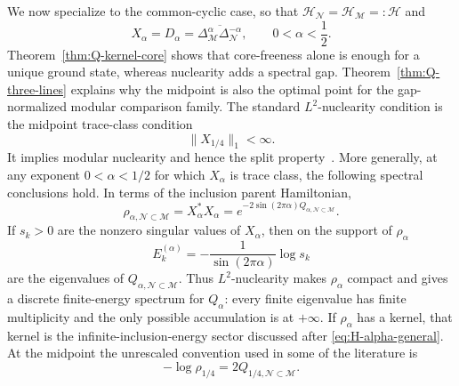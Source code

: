 \documentclass[a4paper,11pt]{article}
\theoremstyle{definition}
\newcommand{\mN}{\mathcal{N}}
\newcommand{\mH}{\mathcal{H}}
\newcommand{\mM}{\mathcal{M}}
\begin{document}
We now specialize to the common-cyclic case, so that
$\mH_{\mN}=\mH_{\mM}=: \mathcal H$ and
\begin{equation}
    X_\alpha=D_\alpha
    =\overline{\Delta_{\mM}^\alpha\Delta_{\mN}^{-\alpha}},
    \qquad 0<\alpha<\frac12 .
\end{equation}
Theorem~\ref{thm:Q-kernel-core} shows that core-freeness alone
is enough for a unique ground state, whereas nuclearity adds a spectral
gap. Theorem~\ref{thm:Q-three-lines} explains why the midpoint is
also the optimal point for the gap-normalized modular comparison family.
The standard $L^2$-nuclearity condition is the midpoint trace-class condition
\begin{equation}
    \boxed{\|X_{1/4}\|_1<\infty .}
    \label{eq:L2-nuclearity-alpha}
\end{equation}
It implies modular nuclearity and hence the split property~\cite{BDL2007}. More generally, at any exponent $0<\alpha<1/2$ for which $X_\alpha$ is trace class, the following spectral conclusions hold. In terms of the inclusion parent Hamiltonian,
\begin{equation}
    \rho_{\alpha,\mN\subset\mM}
    =X_\alpha^*X_\alpha
    =e^{-2\sin(2\pi\alpha)Q_{\alpha,\mN\subset\mM}}.
    \label{eq:rho-inclusion-vs-split}
\end{equation}
If $s_k>0$ are the nonzero singular values of $X_\alpha$, then on the support
of $\rho_\alpha$
\begin{equation}
    E_k^{(\alpha)}
    =-\frac{1}{\sin(2\pi\alpha)}\log s_k
\end{equation}
are the eigenvalues of $Q_{\alpha,\mN\subset\mM}$. Thus $L^2$-nuclearity makes
$\rho_\alpha$ compact and gives a discrete finite-energy spectrum for
$Q_\alpha$: every finite eigenvalue has finite multiplicity and the only
possible accumulation is at $+\infty$. If $\rho_\alpha$ has a kernel, that
kernel is the infinite-inclusion-energy sector discussed after
\eqref{eq:H-alpha-general}. At the midpoint the unrescaled convention used in
some of the literature is
\begin{equation}
    -\log\rho_{1/4}=2Q_{1/4,\mN\subset\mM}.
\end{equation}
\end{document}
